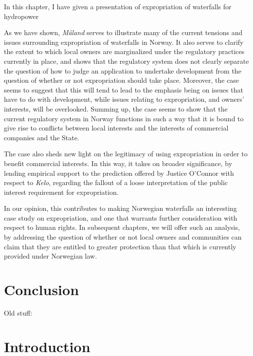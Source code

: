 In this chapter, I have given a presentation of expropriation of waterfalls for hydropower 

As we have shown, \emph{Måland} serves to illustrate many of the current tensions and issues surrounding expropriation of waterfalls in Norway. It also serves to clarify the extent to which local owners are 
marginalized under the regulatory practices currently in place, and shows that the regulatory system does not clearly separate the question of how to judge an application to undertake development from the question of whether or not expropriation should take place. Moreover, the case seems to suggest that this will tend to lead to the emphasis being on issues that have to do with development, while issues relating to expropriation, and owners' interests, will be overlooked. Summing up, the case seems to show that the current regulatory system in Norway functions in such a way that it is bound to give rise to conflicts between local interests and the interests of commercial companies and the State.

The case also sheds new light on the legitimacy of using expropriation in order to benefit commercial interests. In this way, it takes on broader significance, by lending empirical support to the prediction offered by Justice O'Connor with respect to \emph{Kelo}, regarding the fallout of a loose interpretation of the public interest requirement for expropriation.

In our opinion, this contributes to making Norwegian waterfalls an interesting case study on expropriation,  and one that warrants further consideration with respect to human rights. In subsequent chapters, we will offer such an analysis, by addressing the question of whether or not local owners and communities can claim that they are entitled to greater protection than that which is currently provided under Norwegian law.

\section{Conclusion}

Old stuff:

\section{Introduction}\label{intro}

